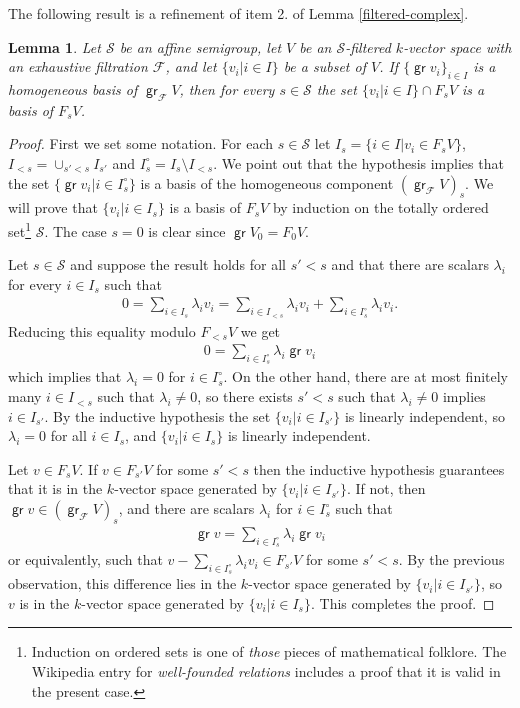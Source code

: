 \documentclass[11pt,fleqn]{article}
\theoremstyle{plain}
\newtheorem{Lemma}[Theorem]{Lemma}
\theoremstyle{remark}
\theoremstyle{definition}
\renewcommand\S{\mathcal S}
\newcommand\F{\mathcal F}
\DeclareMathOperator\gr{\mathsf{gr}}
\begin{document}
The following result is a refinement of item 2. of Lemma \ref{filtered-complex}.
\begin{Lemma}
\label{s-filtered-basis}
	Let $\S$ be an affine semigroup, let $V$ be an $\S$-filtered $k$-vector space 
	with an	exhaustive filtration $\F$, and let $\{v_i |i \in I\}$ be a subset of $V$.
	If $\{\gr v_i\}_{i \in I}$ is a homogeneous basis of $\gr_\F V$, then for
	every $s \in \S$ the set $\{v_i|i \in I\} \cap F_sV$ is a basis of $F_sV$.
\end{Lemma}
\begin{proof}
  First we set some notation. For each $s \in \S$ let $I_{s} = \{i \in I| v_i \in
  F_{s}V\}$, $I_{<s} = \cup_{s'<s} I_{s'}$ and $I_s^\circ = I_s \setminus I_{<s}$. We
  point out that the hypothesis implies that the set $\{\gr v_i| i
  \in I^\circ_s\}$ is a basis of the homogeneous component $(\gr_\F V)_s$. We will
  prove that $\{v_i|i \in I_s\}$ is a basis of $F_{s}V$ by induction on the totally
  ordered set\footnote{Induction on ordered sets is one of \emph{those}
  pieces of mathematical folklore. The Wikipedia entry for \emph{well-founded relations}
  includes a proof that it is valid in the present case.} $\S$. The case $s = 0$ is clear 
  since $\gr V_0 = F_0 V$.

  Let $s \in \S$ and suppose the result holds for all $s'<s$ and that there are 
  scalars $\lambda_i$ for every $i \in I_s$ such that
  \begin{align*}
    0 = \sum_{i \in I_s} \lambda_i v_i = \sum_{i \in I_{<s}} \lambda_i v_i + \sum_{i \in
    I_s^\circ} \lambda_i v_i.
  \end{align*}
  Reducing this equality modulo $F_{<s}V$ we get
  \begin{align*}
    0 = \sum_{i \in I_s^\circ} \lambda_i \gr v_i
  \end{align*}
  which implies that $\lambda_i = 0$ for $i \in I_s^\circ$. On the other hand, there are
  at most finitely many $i \in I_{<s}$ such that $\lambda_i \neq 0$, so
  there exists $s' < s$ such that $\lambda_i \neq 0$ implies $i \in I_{s'}$. By the
  inductive hypothesis the set $\{v_i| i \in I_{s'}\}$ is linearly independent, so
  $\lambda_i = 0$ for all $i \in I_s$, and $\{v_i|i \in I_s\}$ is linearly independent.

  Let $v \in F_sV$. If $v \in F_{s'}V$ for some $s'<s$ then the inductive hypothesis
  guarantees that it is in the $k$-vector space generated by $\{v_i|i \in I_{s'}\}$. If
  not, then $\gr v  \in (\gr_\F V)_s$, and there are scalars $\lambda_i$ for $i \in
  I_s^\circ$ such that 
  \begin{align*}
    \gr v = \sum_{i \in I_s^\circ} \lambda_i \gr v_i
  \end{align*}
  or equivalently, such that $v - \sum_{i \in I_s^\circ} \lambda_i v_i \in F_{s'}V$ for 
  some $s' < s$. By the previous observation, this difference lies in the $k$-vector space
  generated by $\{v_i|i \in I_{s'}\}$, so $v$ is in the $k$-vector space generated by
  $\{v_i|i  \in I_s\}$. This completes the proof.  
\end{proof}
\end{document}
